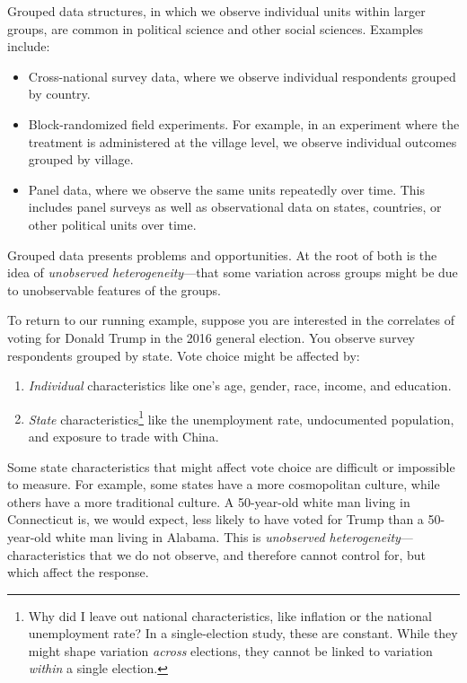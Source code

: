 \documentclass[
  12pt,
  oneside,openany]{book}
\begin{document}
Grouped data structures, in which we observe individual units within larger groups, are common in political science and other social sciences. Examples include:

\begin{itemize}
\item
  Cross-national survey data, where we observe individual respondents grouped by country.
\item
  Block-randomized field experiments. For example, in an experiment where the treatment is administered at the village level, we observe individual outcomes grouped by village.
\item
  Panel data, where we observe the same units repeatedly over time. This includes panel surveys as well as observational data on states, countries, or other political units over time.
\end{itemize}

Grouped data presents problems and opportunities. At the root of both is the idea of \emph{unobserved heterogeneity}---that some variation across groups might be due to unobservable features of the groups.

To return to our running example, suppose you are interested in the correlates of voting for Donald Trump in the 2016 general election. You observe survey respondents grouped by state. Vote choice might be affected by:

\begin{enumerate}
\def\labelenumi{\arabic{enumi}.}
\item
  \emph{Individual} characteristics like one's age, gender, race, income, and education.
\item
  \emph{State} characteristics\footnote{Why did I leave out national characteristics, like inflation or the national unemployment rate? In a single-election study, these are constant. While they might shape variation \emph{across} elections, they cannot be linked to variation \emph{within} a single election.} like the unemployment rate, undocumented population, and exposure to trade with China.
\end{enumerate}

Some state characteristics that might affect vote choice are difficult or impossible to measure. For example, some states have a more cosmopolitan culture, while others have a more traditional culture. A 50-year-old white man living in Connecticut is, we would expect, less likely to have voted for Trump than a 50-year-old white man living in Alabama. This is \emph{unobserved heterogeneity}---characteristics that we do not observe, and therefore cannot control for, but which affect the response.
\end{document}
